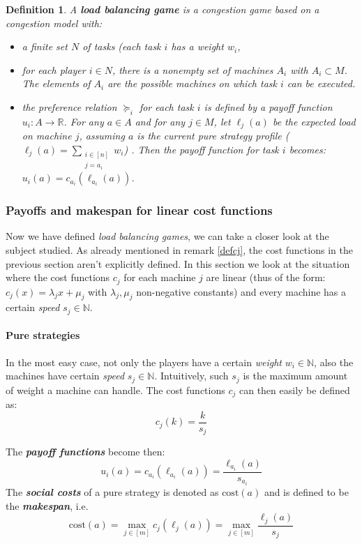 \documentclass[a4paper,11pt]{article}
\newtheorem{definition}[theorem]{Definition}
\newcommand{\N}{{\mathbb N}}
\newcommand{\R}{{\mathbb R}}
\newcommand{\cost}{\text{cost}}
\begin{document}
\begin{definition}\cite{9}
A \textbf{load balancing game} is a congestion game based on a congestion model with:
\begin{itemize}
  \item a finite set $N$ of tasks (each task $i$ has a weight $w_i$,
  \item for each player $i \in N$, there is a nonempty set of machines $A_i$ with $A_i \subset M$. The elements of $A_i$ are the possible machines on which task $i$ can be executed.
  \item the preference relation $\succeq_i$ for each task $i$ is defined by a payoff function $u_i: A \rightarrow \R$. For any $a \in A$ and for any $j \in M$, let $\ell_j(a)$ be \emph{the expected load on machine} $j$, assuming $a$ is the current pure strategy profile ($\ell_j(a) = \sum_{\substack{i \in [n]\\j = a_i}}{w_i}$) . Then the payoff function for task $i$ becomes: $u_i(a) = c_{a_i}(\ell_{a_i}(a))$.
\end{itemize}
\end{definition}


\subsubsection{Payoffs and makespan for linear cost functions}\label{expdefcj}
Now we have defined \emph{load balancing games}, we can take a closer look at the subject studied. As already mentioned in remark \ref{defcj}, the cost functions in the previous section aren't explicitly defined. In this section we look at the situation where the cost functions $c_j$ for each machine $j$ are linear (thus of the form: $c_j(x) = \lambda_jx+\mu_j$ with $\lambda_j, \mu_j$ non-negative constants) and every machine has a certain \emph{speed} $s_j \in \N$.

\paragraph{Pure strategies}
In the most easy case, not only the players have a certain \emph{weight} $w_i \in \N$, also the machines have certain \emph{speed} $s_j \in \N$. Intuitively, such $s_j$ is the maximum amount of weight a machine can handle. The cost functions $c_j$ can then easily be defined as:
$$c_j(k) = \frac{k}{s_j}$$

 The \textbf{\emph{payoff functions}} become then:
$$u_i(a) = c_{a_i}(\ell_{a_i}(a)) =  \frac{\ell_{a_i}(a)}{s_{a_i}}$$
The \emph{\textbf{social costs}} of a pure strategy is denoted as $\cost(a)$ and is defined to be the \emph{\textbf{makespan}}, i.e. $$\cost(a)=\max_{j\in[m]}{c_j(\ell_j(a))} = \max_{j\in[m]}{\frac{\ell_{j}(a)}{s_{j}}}$$
\end{document}
